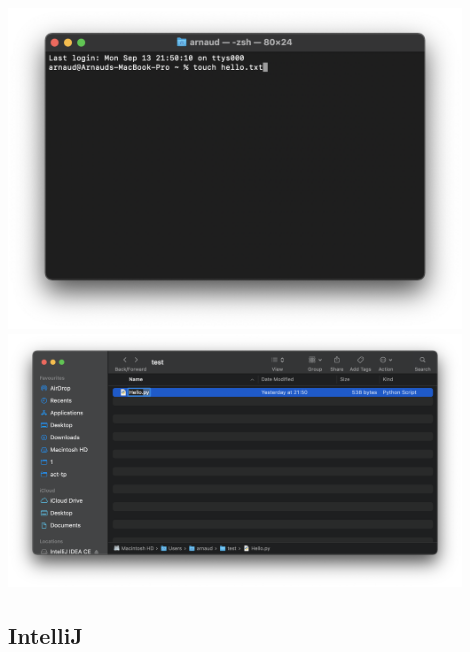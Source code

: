 \begin{center}
	\includegraphics[width=12cm]{terminal.png}
	\includegraphics[width=12cm]{py.png}
	
\end{center}



\subsection{IntelliJ}

